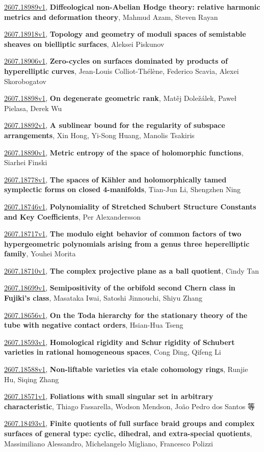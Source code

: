 \documentclass[9pt, a4paper]{article}
\theoremstyle{plain}
\theoremstyle{definition}
\theoremstyle{remark}
\newcommand{\arxiv}[3]{\href{https://arxiv.org/abs/#1}{#1}, \textbf{\textcolor{arxivblue}{#2}}, #3}
\begin{document}
\arxiv{2607.18989v1}{Diffeological non-Abelian Hodge theory: relative harmonic metrics and deformation theory}{Mahmud Azam, Steven Rayan}

\arxiv{2607.18918v1}{Topology and geometry of moduli spaces of semistable sheaves on bielliptic surfaces}{Aleksei Piskunov}

\arxiv{2607.18906v1}{Zero-cycles on surfaces dominated by products of hyperelliptic curves}{Jean-Louis Colliot-Thélène, Federico Scavia, Alexei Skorobogatov}

\arxiv{2607.18898v1}{On degenerate geometric rank}{Matěj Doležálek, Paweł Pielasa, Derek Wu}

\arxiv{2607.18892v1}{A sublinear bound for the regularity of subspace arrangements}{Xin Hong, Yi-Song Huang, Manolis Tsakiris}

\arxiv{2607.18890v1}{Metric entropy of the space of holomorphic functions}{Siarhei Finski}

\arxiv{2607.18778v1}{The spaces of Kähler and holomorphically tamed symplectic forms on closed 4-manifolds}{Tian-Jun Li, Shengzhen Ning}

\arxiv{2607.18746v1}{Polynomiality of Stretched Schubert Structure Constants and Key Coefficients}{Per Alexandersson}

\arxiv{2607.18717v1}{The modulo eight behavior of common factors of two hypergeometric polynomials arising from a genus three heperelliptic family}{Youhei Morita}

\arxiv{2607.18710v1}{The complex projective plane as a ball quotient}{Cindy Tan}

\arxiv{2607.18699v1}{Semipositivity of the orbifold second Chern class in Fujiki's class}{Masataka Iwai, Satoshi Jinnouchi, Shiyu Zhang}

\arxiv{2607.18656v1}{On the Toda hierarchy for the stationary theory of the tube with negative contact orders}{Hsian-Hua Tseng}

\arxiv{2607.18593v1}{Homological rigidity and Schur rigidity of Schubert varieties in rational homogeneous spaces}{Cong Ding, Qifeng Li}

\arxiv{2607.18588v1}{Non-liftable varieties via etale cohomology rings}{Runjie Hu, Siqing Zhang}

\arxiv{2607.18571v1}{Foliations with small singular set in arbitrary characteristic}{Thiago Fassarella, Wodson Mendson, João Pedro dos Santos 等}

\arxiv{2607.18493v1}{Finite quotients of full surface braid groups and complex surfaces of general type: cyclic, dihedral, and extra-special quotients}{Massimiliano Alessandro, Michelangelo Migliano, Francesco Polizzi}
\end{document}
